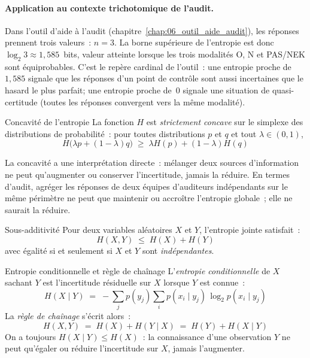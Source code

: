 \paragraph{Application au contexte trichotomique de l'audit.}
Dans l'outil d'aide à l'audit (chapitre~\ref{chap:06_outil_aide_audit}), les réponses
prennent trois valeurs~: $n = 3$. La borne supérieure de l'entropie est donc
$\log_2 3 \approx 1{,}585$~bits, valeur atteinte lorsque les trois modalités O, N
et PAS/NEK sont équiprobables. C'est le repère cardinal de l'outil~: une entropie
proche de~$1{,}585$ signale que les réponses d'un point de contrôle sont aussi
incertaines que le hasard le plus parfait; une entropie proche de~0 signale une
situation de quasi-certitude (toutes les réponses convergent vers la même
modalité).

\begin{boiteTheoreme}{Concavité de l'entropie}
La fonction $H$ est \emph{strictement concave} sur le simplexe des distributions
de probabilité~: pour toutes distributions $p$ et $q$ et tout $\lambda \in (0,1)$,
\begin{equation}
  H\bigl(\lambda p + (1-\lambda) q\bigr) \;\geq\; \lambda H(p) + (1-\lambda) H(q)
  \label{eq:concavite}
\end{equation}
\end{boiteTheoreme}

La concavité a une interprétation directe~: mélanger deux sources d'information
ne peut qu'augmenter ou conserver l'incertitude, jamais la réduire. En termes
d'audit, agréger les réponses de deux équipes d'auditeurs indépendants sur le même
périmètre ne peut que maintenir ou accroître l'entropie globale~; elle ne saurait
la réduire.

\begin{boiteTheoreme}{Sous-additivité}
Pour deux variables aléatoires $X$ et $Y$, l'entropie jointe satisfait~:
\begin{equation}
  H(X, Y) \;\leq\; H(X) + H(Y)
  \label{eq:sous-additivite}
\end{equation}
avec égalité si et seulement si $X$ et $Y$ sont \emph{indépendantes}.
\end{boiteTheoreme}

\begin{boiteTheoreme}{Entropie conditionnelle et règle de chaînage}
L'\emph{entropie conditionnelle} de $X$ sachant $Y$ est l'incertitude résiduelle
sur $X$ lorsque $Y$ est connue~:
\begin{equation}
  H(X \mid Y) \;=\; -\sum_{j} p(y_j) \sum_{i} p(x_i \mid y_j)\,\log_2 p(x_i \mid y_j)
  \label{eq:entropie-cond}
\end{equation}
La \emph{règle de chaînage} s'écrit alors~:
\begin{equation}
  H(X, Y) \;=\; H(X) + H(Y \mid X) \;=\; H(Y) + H(X \mid Y)
  \label{eq:chainage}
\end{equation}
On a toujours $H(X \mid Y) \leq H(X)$~: la connaissance d'une observation $Y$
ne peut qu'égaler ou réduire l'incertitude sur $X$, jamais l'augmenter.
\end{boiteTheoreme}

